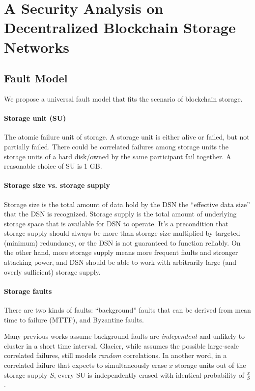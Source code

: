 \section{A Security Analysis on Decentralized Blockchain Storage Networks}
\label{sec:model}

\subsection{Fault Model}

We propose a universal fault model that fits the scenario of blockchain storage.

\paragraph{Storage unit (SU)}
The atomic failure unit of storage.
A storage unit is either alive or failed, but not partially failed.
There could be correlated failures among storage units \eg the storage units of a hard disk/owned by the same participant fail together.
A reasonable choice of SU is 1 GB.

\paragraph{Storage size vs. storage supply}
Storage size is the total amount of data hold by the DSN \ie the ``effective data size'' that the DSN is recognized.
Storage supply is the total amount of underlying storage space that is available for DSN to operate.
It's a precondition that storage supply should always be more than storage size multiplied by targeted (minimum) redundancy, or the DSN is not guaranteed to function reliably.
On the other hand, more storage supply means more frequent faults and stronger attacking power, and DSN should be able to work with arbitrarily large (and overly sufficient) storage supply.

\paragraph{Storage faults}
There are two kinds of faults: ``background'' faults that can be derived from mean time to failure (MTTF), and Byzantine faults.

Many previous works assume background faults are \emph{independent} and unlikely to cluster in a short time interval.
Glacier, while assumes the possible large-scale correlated failures, still models \emph{random} correlations.
In another word, in a correlated failure that expects to simultaneously erase $x$ storage units out of the storage supply $S$, every SU is independently erased with identical probability of $\frac{x}{S}$.

